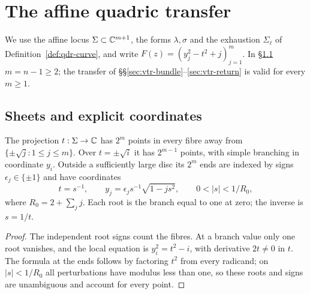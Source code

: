 \section{The affine quadric transfer}\label{sec:vtr}

We use the affine locus $\Sigma\subset\mathbb{C}^{m+1}$, the forms $\lambda,\sigma$ and the exhaustion $\Sigma_\ell$ of
Definition~\ref{def:qdr-curve}, and write $F(z)=(y_j^2-t^2+j)_{j=1}^m$. In \S\ref{sec:vtr-curve} $m=n-1\ge2$; the transfer of
\S\S\ref{sec:vtr-bundle}--\ref{sec:vtr-return} is valid for every $m\ge1$.

\subsection{Sheets and explicit coordinates}\label{sec:vtr-curve}

\begin{lemma}\label{lem:vtr-square}
The projection $t:\Sigma\to\mathbb{C}$ has $2^m$ points in every fibre away from $\{\pm\sqrt j:1\le j\le m\}$. Over $t=\pm\sqrt i$ it has
$2^{m-1}$ points, with simple branching in coordinate $y_i$. Outside a sufficiently large disc its $2^m$ ends are indexed by signs
$\epsilon_j\in\{\pm1\}$ and have coordinates
\[
 t=s^{-1},\qquad y_j=\epsilon_j s^{-1}\sqrt{1-js^2},\qquad 0<|s|<1/R_0,
\]
where $R_0=2+\sum_jj$. Each root is the branch equal to one at zero; the inverse is $s=1/t$.
\end{lemma}

\begin{proof}
The independent root signs count the fibres. At a branch value only one root vanishes, and the local equation is $y_i^2=t^2-i$, with
derivative $2t\ne0$ in $t$. The formula at the ends follows by factoring $t^2$ from every radicand; on $|s|<1/R_0$ all perturbations
have modulus less than one, so these roots and signs are unambiguous and account for every point.
\end{proof}

